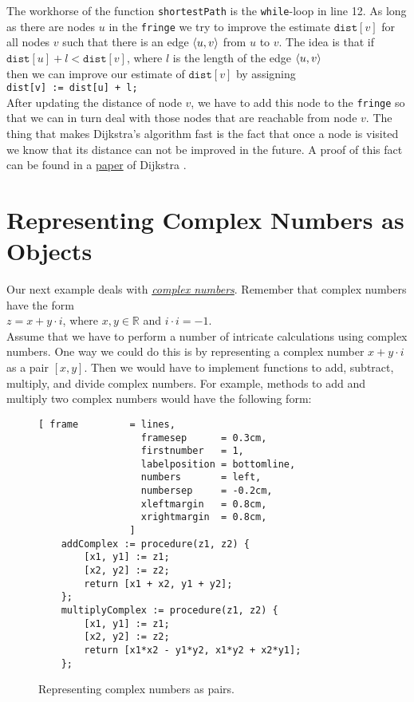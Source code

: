 The workhorse of the function \texttt{shortestPath} is the \texttt{while}-loop in line 12.  As long
as there are nodes $u$ in the \texttt{fringe} we try to improve the estimate $\mathtt{dist}[v]$ for
all nodes $v$ such that there is an edge $\pair(u,v)$ from $u$ to $v$.  The idea is that if 
\\[0.2cm]
\hspace*{1.3cm}
$\mathtt{dist}[u] + l < \mathtt{dist}[v]$, \quad where $l$ is the length of the edge $\pair(u,v)$
\\[0.2cm]
then we can improve our estimate of $\texttt{dist}[v]$ by assigning
\\[0.2cm]
\hspace*{1.3cm}
\texttt{dist[v] := dist[u] + l;}
\\[0.2cm]
After updating the distance of node $v$, we have to add this node to the \texttt{fringe} so that we
can in turn deal with those nodes that are reachable from node $v$.  The thing that makes Dijkstra's
algorithm fast is the fact that once a node is visited we know that its distance can not be improved
in the future.  A proof of this fact can be found in a 
\href{http://www-m3.ma.tum.de/foswiki/pub/MN0506/WebHome/dijkstra.pdf}{paper} of Dijkstra \cite{dijkstra:59}.


\section{Representing Complex Numbers as Objects}
Our next example deals with 
\href{http://en.wikipedia.org/wiki/Complex_number}{\emph{complex numbers}}.  
Remember that complex numbers have the form
\\[0.2cm]
\hspace*{1.3cm}
$z = x + y \cdot i$, \quad where $x,y \in \mathbb{R}$ and $i \cdot i = -1$.
\\[0.2cm]
Assume that we have to perform a number of intricate calculations using complex numbers.  One way
we could do this is by representing a complex number $x + y \cdot i$ as a pair $[x,y]$.  Then we
would have to implement functions to add, subtract, multiply,  and divide complex numbers.  For
example, methods to add and multiply two complex numbers would have the following form: 
\begin{figure}[!ht]
\centering
\begin{Verbatim}[ frame         = lines, 
                  framesep      = 0.3cm, 
                  firstnumber   = 1,
                  labelposition = bottomline,
                  numbers       = left,
                  numbersep     = -0.2cm,
                  xleftmargin   = 0.8cm,
                  xrightmargin  = 0.8cm,
                ]
    addComplex := procedure(z1, z2) {
        [x1, y1] := z1;
        [x2, y2] := z2;
        return [x1 + x2, y1 + y2];	
    }; 
    multiplyComplex := procedure(z1, z2) {
        [x1, y1] := z1;
        [x2, y2] := z2;
        return [x1*x2 - y1*y2, x1*y2 + x2*y1];	
    }; 
\end{Verbatim}
\vspace*{-0.3cm}
\caption{Representing complex numbers as pairs.}
\label{fig:add-complex.stlx}
\end{figure}



